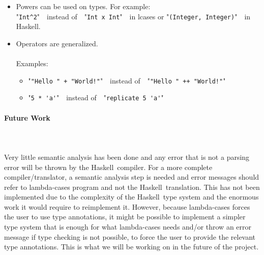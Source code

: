 \documentclass[diploma]{softlab-thesis}
\def\H{Haskell}
\def\pend{\mbox{}\\\\}
\begin{document}
\begin{itemize}
\begin{itemize}
\item
\begin{verbatim}
(cases, cases)
  (green, green) => true
  (amber, amber) => true
  (red, red) => true
  ... => false
\end{verbatim}
instead of
\begin{verbatim}
\x y -> case (x, y) of
  (Green, Green) -> True
  (Amber, Amber) -> True
  (Red, Red) -> True
  _ -> False
\end{verbatim}
\end{itemize}

\item Powers can be used on types.  For example:\\

"\verb|Int^2|"\ \  instead of\ \  "\verb|Int x Int|"\ \  in lcases or
"\verb|(Integer, Integer)|"\ \
in \H. \\

\item Operators are generalized. \\\\
Examples:

\begin{itemize}

\item
"\verb|"Hello " + "World!"|"\ \ instead of\ \ "\verb|"Hello " ++ "World!"|"

\item
"\verb|5 * 'a'|"\ \ instead of\ \ "\verb|replicate 5 'a'|"

\end{itemize}


\end{itemize}

\newpage
\paragraph{Future Work}\pend
Very little semantic analysis has been done and any error that is not a
parsing error will be thrown by the \H\ compiler. For a more complete
compiler/translator, a semantic analysis step is needed and error messages
should refer to lambda-cases program and not the \H\ translation. This has not
been implemented due to the complexity of the \H\ type system and the enormous
work it would require to reimplement it. However, because lambda-cases forces
the user to use type annotations, it might be possible to implement a simpler
type system that is enough for what lambda-cases needs and/or throw an error
message if type checking is not possible, to force the user to provide the
relevant type annotations. This is what we will be working on in the future
of the project.



\nocite{*}

% 





\backmatter

\appendix

\end{document}
